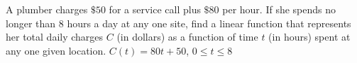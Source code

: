 {A plumber charges $\$50$ for a service call plus $\$80$ per hour.  If she spends no longer than 8 hours a day at any one site, find a linear function that represents her total daily charges $C$ (in dollars) as a function of time $t$ (in hours) spent at any one given location.}
{ $C(t) = 80t + 50$,  $0 \leq t \leq 8$}